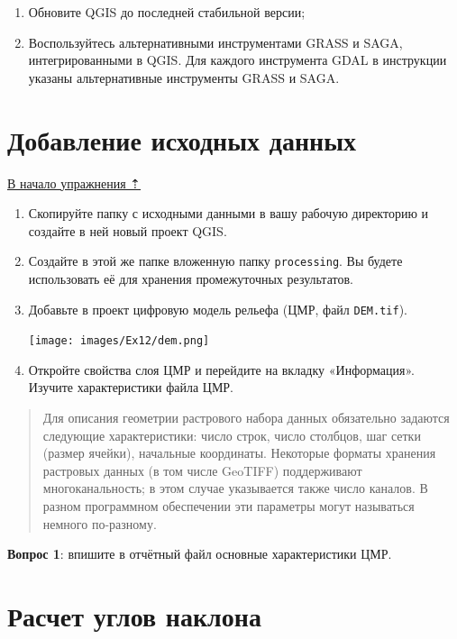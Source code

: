 \documentclass[
  12pt,
]{book}
\begin{document}
\begin{enumerate}
\def\labelenumi{\arabic{enumi})}
\item
  Обновите QGIS до последней стабильной версии;
\item
  Воспользуйтесь альтернативными инструментами GRASS и SAGA, интегрированными в QGIS. Для каждого инструмента GDAL в инструкции указаны альтернативные инструменты GRASS и SAGA.
\end{enumerate}

\hypertarget{weighted-overlay-init}{%
\section{Добавление исходных данных}\label{weighted-overlay-init}}

\protect\hyperlink{weighted-overlay}{В начало упражнения ⇡}

\begin{enumerate}
\def\labelenumi{\arabic{enumi}.}
\item
  Скопируйте папку с исходными данными в вашу рабочую директорию и создайте в ней новый проект QGIS.
\item
  Создайте в этой же папке вложенную папку \texttt{processing}. Вы будете использовать её для хранения промежуточных результатов.
\item
  Добавьте в проект цифровую модель рельефа (ЦМР, файл \texttt{DEM.tif}).

  \texttt{[image: images/Ex12/dem.png]}
\item
  Откройте свойства слоя ЦМР и перейдите на вкладку «Информация». Изучите характеристики файла ЦМР.
\end{enumerate}

\begin{quote}
Для описания геометрии растрового набора данных обязательно задаются следующие характеристики: число строк, число столбцов, шаг сетки (размер ячейки), начальные координаты. Некоторые форматы хранения растровых данных (в том числе GeoTIFF) поддерживают многоканальность; в этом случае указывается также число каналов. В разном программном обеспечении эти параметры могут называться немного по-разному.
\end{quote}

\textbf{Вопрос 1}: впишите в отчётный файл основные характеристики ЦМР.

\hypertarget{weighted-overlay-slopes}{%
\section{Расчет углов наклона}\label{weighted-overlay-slopes}}
\end{document}
